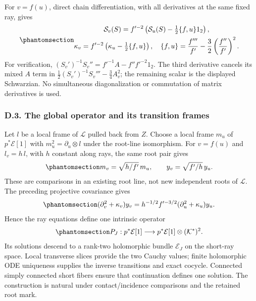 \documentclass[
  english,
  11pt,
  reqno]{amsart}
\begin{document}
For \(v=f(u)\), direct chain differentiation, with all derivatives at
the same fixed ray, gives
\begin{equation}\protect\phantomsection\label{eq:gg-intrinsic-projective-covariance}{\begin{gathered}
\mathcal S_v(S)=f'^{-2}
       \left(\mathcal S_u(S)-\tfrac12\{f,u\}1_2\right), \\
\kappa_v=f'^{-2}\left(\kappa_u-\tfrac12\{f,u\}\right),
 \quad
 \{f,u\}=\frac{f'''}{f'}-\frac32\left(\frac{f''}{f'}\right)^2.
\end{gathered}}\end{equation} For verification,
\((S_v')^{-1}S_v''=f'^{-1}A-f''f'^{-2}1_2\). The third derivative
cancels its mixed \(A\) term in
\(\frac12(S_v')^{-1}S_v'''-\frac34A_v^2\); the remaining scalar is the
displayed Schwarzian. No simultaneous diagonalization or commutation of
matrix derivatives is used.

\protect{}\label{sec:gg-optical-actual-cauchy}

\subsubsection{D.3. The global operator and its transition
frames}\label{d.3.-the-global-operator-and-its-actual-transition-frames}

Let \(l\) be a local frame of \(\mathcal L\) pulled back from \(Z\).
Choose a local frame \(m_u\) of \(p^*\mathcal E[1]\) with
\(m_u^2=\partial_u\otimes l\) under the root-line isomorphism. For
\(v=f(u)\) and \(l_v=h\,l\), with \(h\) constant along rays, the same
root pair gives
\begin{equation}\protect\phantomsection\label{eq:gg-intrinsic-half-density-change}{
 m_v=\sqrt{h/f'}\,m_u,\qquad
 y_v=\sqrt{f'/h}\,y_u .
}\end{equation} These are comparisons in an existing root line, not new
independent roots of \(\mathcal L\). The preceding projective covariance
gives
\begin{equation}\protect\phantomsection\label{eq:gg-intrinsic-operator-change}{
 (\partial_v^2+\kappa_v)y_v
       =h^{-1/2}f'^{-3/2}
                     (\partial_u^2+\kappa_u)y_u.
}\end{equation} Hence the ray equations define one intrinsic operator
\begin{equation}\protect\phantomsection\label{eq:gg-intrinsic-ray-operator}{
 P_J:p^*\mathcal E[1]\longrightarrow
                  p^*\mathcal E[1]\otimes(\mathcal K^*)^2.
}\end{equation} Its solutions descend to a rank-two holomorphic bundle
\(\mathcal E_J\) on the short-ray space. Local transverse slices provide
the two Cauchy values; finite holomorphic ODE uniqueness supplies the
inverse transitions and exact cocycle. Connected simply connected short
fibers ensure that continuation defines one solution. The construction
is natural under contact/incidence comparisons and the retained root
mark.
\end{document}
